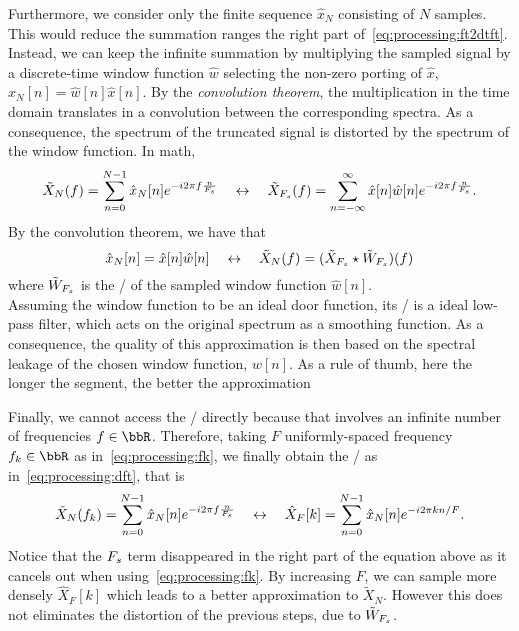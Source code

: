 \mynewline
Furthermore, we consider only the finite sequence $\hat{x}_N$ consisting of $N$ samples.
This would reduce the summation ranges the right part of~\cref{eq:processing:ft2dtft}.
Instead, we can keep the infinite summation by multiplying the sampled signal by a discrete-time window function $\hat{w}$ selecting the non-zero porting of $\hat{x}$, $\hat{x}_N[n] = \hat{w}[n]\hat{x}[n]$.
By the \textit{convolution theorem}, the multiplication in the time domain translates in a convolution between the corresponding spectra.
As a consequence, the spectrum of the truncated signal is distorted by the spectrum of the window function.
In math,
\begin{equation}\label{eq:processing:ft2dtft}
    \tilde{X}_N(f) =
    \sum_{n=0}^{N-1}
    \hat{x}_N[n]
    {e}^{-{i}2\pi f \frac{n}{F_s}}
    \quad \leftrightarrow \quad
    \tilde{X}_{F_s}( f) =
    \sum_{n = -\infty}^{\infty}
    \hat{x}[ n] \hat{w}[ n]
    {e}^{-{i}2\pi f \frac{n}{F_s}}
    .
\end{equation}
By the convolution theorem, we have that
\begin{equation}
    \hat{x}_N[n] = \hat{x}[ n] \hat{w}[ n]
    \quad \leftrightarrow \quad
    \tilde{X}_{N}(f) = (\tilde{X}_{F_s} \star \tilde{W}_{F_s})(f)
\end{equation}
where $\tilde{W}_{F_s}$ is the \DTFT/ of the sampled window function $\hat{w}[n]$.
\\Assuming the window function to be an ideal door function, its \DTFT/ is a ideal low-pass filter, which acts on the original spectrum as a smoothing function.
As a consequence, the quality of this approximation is then based on the spectral leakage of the chosen window function, $w[n]$.
As a rule of thumb, here the longer the segment, the better the approximation%

\mynewline
Finally, we cannot access the \DTFT/ directly because that involves an infinite number of frequencies $f \in \R$.
Therefore, taking $F$ uniformly-spaced frequency $f_k\in\R$ as in~\cref{eq:processing:fk}, we finally obtain the \DFT/ as in~\cref{eq:processing:dft}, that is
\begin{equation}
    \tilde{X}_N(f_k) =
    \sum_{n=0}^{N-1}
    \hat{x}_N[n]
    {e}^{-{i}2\pi f \frac{n}{F_s}}
    \quad \leftrightarrow \quad
    \hat{X}_F[k] =
    \sum_{n=0}^{N-1}
    \hat{x}_N[n]
    {e}^{-{i}2\pi k n / F}
    .
\end{equation}
Notice that the $F_s$ term disappeared in the right part of the equation above as it cancels out when using~\cref{eq:processing:fk}.
By increasing $F$, we can sample more densely $\hat{X}_F[k]$ which leads to a better approximation to $\tilde{X}_N$.
However this does not eliminates the distortion of the previous steps, due to $\tilde{W}_{F_s}$.

